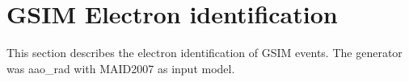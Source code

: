 \clearpage\newpage
\section{GSIM Electron identification}
This section describes the electron identification of GSIM events. The generator was aao_rad with MAID2007 as input model.

